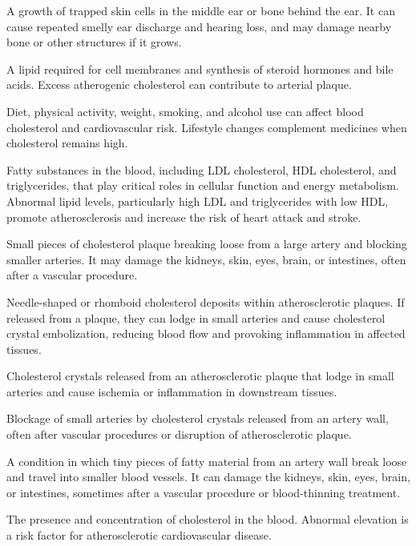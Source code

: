  A growth of trapped skin cells in the middle ear or bone behind the ear. It can cause repeated smelly ear discharge and hearing loss, and may damage nearby bone or other structures if it grows.

 A lipid required for cell membranes and synthesis of steroid hormones and bile acids. Excess atherogenic cholesterol can contribute to arterial plaque.


 Diet, physical activity, weight, smoking, and alcohol use can affect blood cholesterol and cardiovascular risk. Lifestyle changes complement medicines when cholesterol remains high.

 Fatty substances in the blood, including LDL cholesterol, HDL cholesterol, and
triglycerides, that play critical roles in cellular function and energy metabolism.
Abnormal lipid levels, particularly high LDL and triglycerides with low HDL, promote
atherosclerosis and increase the risk of heart attack and stroke.

 Small pieces of cholesterol plaque breaking loose from a large artery and blocking smaller arteries. It may damage the kidneys, skin, eyes, brain, or intestines, often after a vascular procedure.

 Needle-shaped or rhomboid cholesterol deposits within atherosclerotic plaques. If released from a plaque, they can lodge in small arteries and cause cholesterol crystal embolization, reducing blood flow and provoking inflammation in affected tissues.

 Cholesterol crystals released from an atherosclerotic plaque that lodge in small arteries and cause
ischemia or inflammation in downstream tissues.

 Blockage of small arteries by cholesterol crystals released from an artery wall, often after vascular procedures or disruption of atherosclerotic plaque.

 A condition in which tiny pieces of fatty material from an artery wall break loose and travel into smaller blood vessels. It can damage the kidneys, skin, eyes, brain, or intestines, sometimes after a vascular procedure or blood-thinning treatment.

 The presence and concentration of cholesterol in the blood. Abnormal elevation is a risk
factor for atherosclerotic cardiovascular disease.

